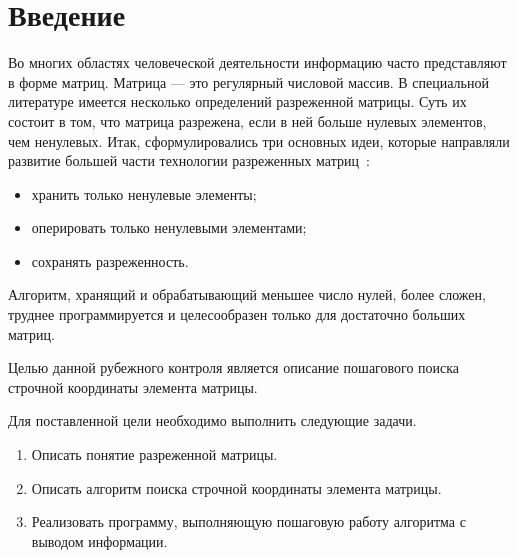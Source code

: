\chapter*{Введение}

Во многих областях человеческой деятельности информацию часто представляют в форме матриц.
Матрица --- это регулярный числовой массив. 
В специальной литературе имеется несколько определений разреженной матрицы. 
Суть их состоит в том, что матрица разрежена, если в ней больше нулевых элементов, чем ненулевых.
Итак, сформулировались три основных идеи, которые направляли развитие большей части технологии разреженных
матриц~\cite{csr}: 
\begin{itemize}
	\item хранить только ненулевые элементы;
	\item оперировать только ненулевыми элементами;
	\item сохранять разреженность.
\end{itemize}

Алгоритм, хранящий и обрабатывающий меньшее число нулей, более сложен, труднее программируется и целесообразен только для достаточно больших матриц.

Целью данной рубежного контроля является описание пошагового поиска строчной координаты элемента матрицы.

Для поставленной цели необходимо выполнить следующие задачи.
\begin{enumerate}
	\item Описать понятие разреженной матрицы.
	\item Описать алгоритм поиска строчной координаты элемента матрицы.
	\item Реализовать программу, выполняющую пошаговую работу алгоритма с выводом информации.
\end{enumerate}